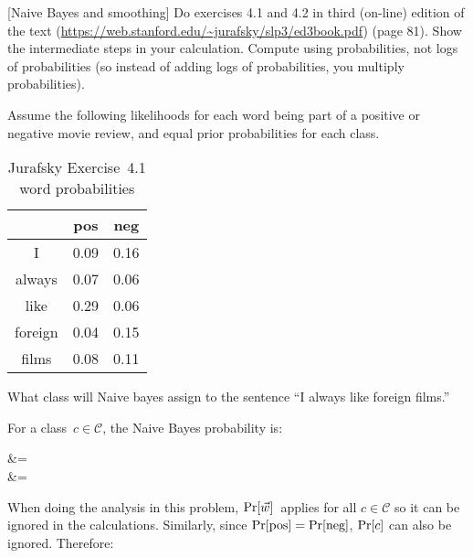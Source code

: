 \begin{problem}
   [Naive Bayes and smoothing] Do exercises 4.1 and 4.2 in third (on-line) edition of the text (\url{https://web.stanford.edu/~jurafsky/slp3/ed3book.pdf}) (page 81). Show the intermediate steps in your calculation. Compute using probabilities, not logs of probabilities (so instead of adding logs of probabilities, you multiply probabilities).
\end{problem}

\begin{subproblem}\label{P02:A}
  Assume the following likelihoods for each word being part of a positive or negative movie review, and equal prior probabilities for each class.

  \begin{table}[h]
    \centering
    \caption{Jurafsky Exercise~4.1 word probabilities}\label{tab:}
    \begin{tabular}{ccc}
              & pos  & neg \\\hline
      I       & 0.09 & 0.16 \\
      always  & 0.07 & 0.06 \\
      like    & 0.29 & 0.06 \\
      foreign & 0.04 & 0.15 \\
      films   & 0.08 & 0.11 \\
    \end{tabular}
  \end{table}

  What  class  will  Naive  bayes  assign  to  the  sentence  ``I  always  like  foreign films.''
\end{subproblem}

For a class~${c \in \mathcal{C}}$, the Naive Bayes probability is:

\begin{aligncustom}
  \Pr {} &=  \\
                               &= 
\end{aligncustom}

\noindent
When doing the analysis in this problem, ${\Pr\lbrack\vec{w}\rbrack}$~applies for all ${c \in \mathcal{C}}$ so it can be ignored in the calculations.  Similarly, since ${\Pr\lbrack\text{pos}\rbrack = \Pr\lbrack\text{neg}\rbrack}$, ${\Pr\lbrack c\rbrack}$ can also be ignored.  Therefore:

